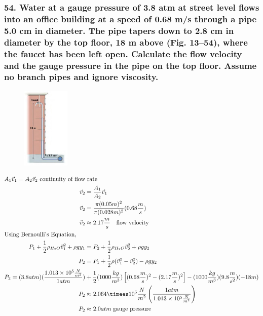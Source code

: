 \documentclass{article}
\begin{document}
\subsubsection*{
    54. Water at a gauge pressure of 3.8 atm at street level flows into an
    office building at a speed of 0.68 m/s through a pipe 5.0 cm in diameter.
    The pipe tapers down to 2.8 cm in diameter by the top floor, 18 m above
    (Fig. 13–54), where the faucet has been left open. Calculate the flow
    velocity and the gauge pressure in the pipe on the top floor. Assume no
    branch pipes and ignore viscosity.
}
\begin{figure}[h]
    \begin{center}
        \includegraphics[width=0.2\textwidth]{figures/p54.jpg}
    \end{center}
\end{figure}
\begin{align*}
    \intertext{$A_1\vec v_1 = A_2\vec v_2$ continuity of flow rate}
    \vec v_2 &= \displaystyle\frac{A_1}{A_2}\vec v_1 \\
    \vec v_2 &= \displaystyle\frac{\pi(0.05m)^2}{\pi(0.028m)^2}(0.68\frac m s) \\
    \vec v_2 &\approx 2.17\frac m s \quad\text{flow velocity} \\
    \intertext{Using Bernoulli's Equation,}
    P_{1} + \frac 1 2 \rho_{H_2O}\vec v_{1}^2 + \rho gy_{1} &= P_{2} + \frac 1 2 \rho_{H_2O}\vec v_{2}^2 + \rho gy_{2} \\
    P_2 &= P_1 + \frac 1 2 \rho(\vec v_1^2 - \vec v_2^2) - \rho gy_2 \\
    P_2 = (3.8atm)(\displaystyle\frac{1.013\times 10^5 \frac{N}{m^2}}{1atm}) &+
\frac 1 2 (1000 \frac{kg}{m^3})\left[(0.68\frac m s)^2 - (2.17\frac m s)^2\right] - (1000 \frac{kg}{m^3})(9.8 \frac m {s^2})(-18m) \\
    P_2 &\approx 2.064\timees 10^5
    \displaystyle\frac{N}{m^2}\left(\frac{1atm}{1.013\times 10^5 \frac{N}{m^2}}\right) \\
    P_2 &\approx 2.0atm\;\text{gauge pressure}
\end{align*}
\end{document}
